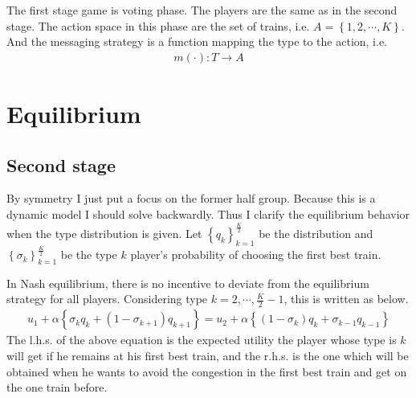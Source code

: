 \documentclass{article}
\begin{document}
The first stage game is voting phase. The players are the same as in the second stage. The action space in this phase are the set of trains, i.e. $A = \left\{ 1,2,\cdots, K \right\}$. And the messaging strategy is a function mapping the type to the action, i.e.
\begin{align*}
	m(\cdot) : T \to A
\end{align*}

\section{Equilibrium}
\subsection{Second stage}
By symmetry I just put a focus on the former half group. Because this is a dynamic model I should solve backwardly. Thus I clarify the equilibrium behavior when the type distribution is given. Let $\left\{ q_k \right\}_{k = 1}^{\frac{K}{2}}$ be the distribution and $\left\{ \sigma_k \right\}_{k = 1}^{\frac{K}{2}}$ be the type $k$ player's probability of choosing the first best train. 

In Nash equilibrium, there is no incentive to deviate from the equilibrium strategy for all players. Considering type $k = 2, \cdots, \frac{K}{2} -1$, this is written as below.
\begin{align*}
	u_1 + \alpha \left\{ \sigma_k q_k + (1-\sigma_{k+1}) q_{k+1} \right\} = u_2 + \alpha \left\{ (1-\sigma_k) q_k + \sigma_{k-1} q_{k-1} \right\}
\end{align*}
The l.h.s. of the above equation is the expected utility the player whose type is $k$ will get if he remains at his first best train, and the r.h.s. is the one which will be obtained when he wants to avoid the congestion in the first best train and get on the one train before.
\end{document}

